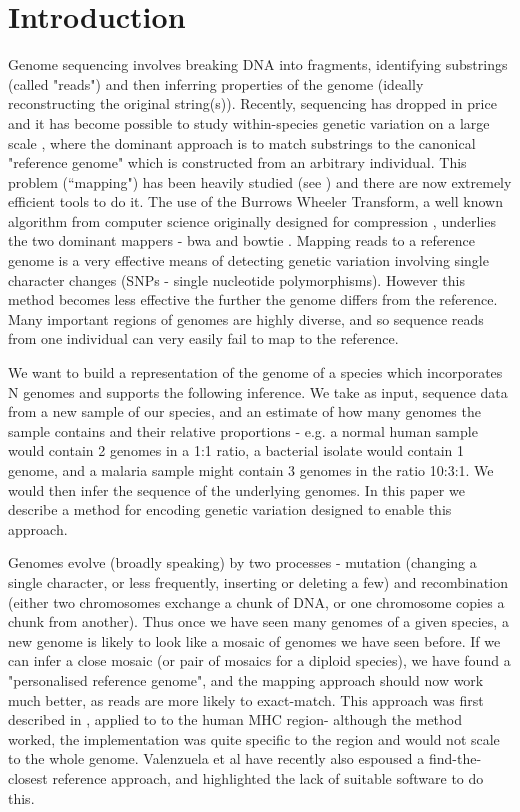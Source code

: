 \documentclass[runningheads,a4paper]{llncs}
\begin{document}
\section{Introduction}

Genome sequencing involves breaking  DNA into fragments, identifying substrings (called "reads") and then inferring properties of the genome (ideally reconstructing the original string(s)). Recently, sequencing has dropped in price and it has become possible to study within-species genetic variation on a large scale \cite{1000g,arabi,pombe}, where the dominant approach is to match substrings to the canonical "reference genome" which is constructed from an arbitrary individual.  This problem (``mapping") has been heavily studied  (see \cite{reinert}) and there are now extremely efficient tools to do it. The use of the Burrows Wheeler Transform, a well known algorithm from computer science originally designed for compression  \cite{bwt}, underlies the two dominant mappers - bwa \cite{bwa} and bowtie \cite{bowtie}. Mapping reads to a reference genome is a very effective means of detecting genetic variation involving single character changes (SNPs - single nucleotide polymorphisms). However this method becomes less effective the further the genome differs from the reference.  Many important regions of genomes are highly diverse, and so sequence reads from one individual can very easily fail to map to the reference. 

We  want to build a representation of the genome of a species which incorporates N genomes and supports the following inference. We take as input, sequence data from a new sample of our species, and  an estimate of how many genomes the sample contains and their relative proportions - e.g. a normal human sample would contain 2 genomes in a 1:1 ratio, a bacterial isolate would contain 1 genome, and a malaria sample might contain 3 genomes in the ratio 10:3:1. We would then infer the sequence of the underlying genomes. In this paper we describe a method for encoding genetic variation designed to enable this approach. 

Genomes evolve (broadly speaking) by two processes - mutation (changing a single character, or less frequently, inserting or deleting a few) and recombination (either two chromosomes exchange a chunk of DNA, or one chromosome copies a chunk from another). Thus once we have seen many genomes of a given species, a new genome is likely to look like a mosaic of genomes we have seen before.  If we can infer a close mosaic (or pair of mosaics for a diploid species), we have found a "personalised reference genome", and the mapping approach should now work much better, as reads are more likely to exact-match. This approach was first described in \cite{dilthey}, applied to to the human MHC region-  although the method worked, the implementation was quite specific to the region and would not scale to the whole genome. Valenzuela et al \cite{valen} have recently also espoused a find-the-closest reference approach, and highlighted the lack of suitable software to do this.
\end{document}

